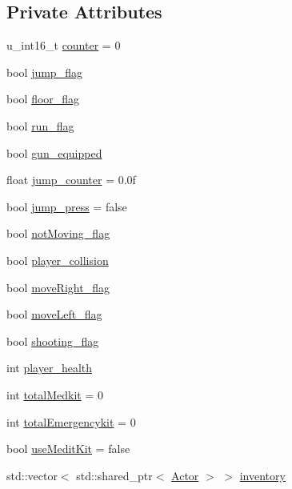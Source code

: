 \subsection*{Private Attributes}
\begin{DoxyCompactItemize}
\item 
u\+\_\+int16\+\_\+t \hyperlink{classPlayer__Actor_ae392d308c81c20d2ba78977e603dd763}{counter} = 0
\item 
bool \hyperlink{classPlayer__Actor_abd1024a297da126585473107dd18cd36}{jump\+\_\+flag}
\item 
bool \hyperlink{classPlayer__Actor_a875dcbb2fb8f6137aca4db4bed52bfc4}{floor\+\_\+flag}
\item 
bool \hyperlink{classPlayer__Actor_accaacebffc34b4de8f31b4f1a01c8b07}{run\+\_\+flag}
\item 
bool \hyperlink{classPlayer__Actor_ac6838eeaee0d1c410c6ad38d7dc58de3}{gun\+\_\+equipped}
\item 
float \hyperlink{classPlayer__Actor_a2f39b4d1744ef68ebffff9e3d0687370}{jump\+\_\+counter} = 0.\+0f
\item 
bool \hyperlink{classPlayer__Actor_ac1d4da4a16e278049188e806e19e0dd4}{jump\+\_\+press} = false
\item 
bool \hyperlink{classPlayer__Actor_a24dc8b52b9a18c32a601e8d94ca821fa}{not\+Moving\+\_\+flag}
\item 
bool \hyperlink{classPlayer__Actor_ae86176443ffe48bad21a47f95344a5bc}{player\+\_\+collision}
\item 
bool \hyperlink{classPlayer__Actor_ab163e2b03c5574c27363eac7c4e490b6}{move\+Right\+\_\+flag}
\item 
bool \hyperlink{classPlayer__Actor_aad154bbc001d08164164f8bc6f8089c6}{move\+Left\+\_\+flag}
\item 
bool \hyperlink{classPlayer__Actor_a3bfbebffbbab8a4d38a9eff8d5c70716}{shooting\+\_\+flag}
\item 
int \hyperlink{classPlayer__Actor_a7816575efd6d3662d5399794e02e1022}{player\+\_\+health}
\item 
int \hyperlink{classPlayer__Actor_a5182bf46a1e6fd349fcfcc727f5379db}{total\+Medkit} = 0
\item 
int \hyperlink{classPlayer__Actor_a92aad807dec9f045e4619de7cc5bf555}{total\+Emergencykit} = 0
\item 
bool \hyperlink{classPlayer__Actor_ab6793edf4da7028fcb021be5cf9f6388}{use\+Medit\+Kit} = false
\item 
std\+::vector$<$ std\+::shared\+\_\+ptr$<$ \hyperlink{classActor}{Actor} $>$ $>$ \hyperlink{classPlayer__Actor_ab3cc255217ada6bbfad38bf774b2d12e}{inventory}
\end{DoxyCompactItemize}
